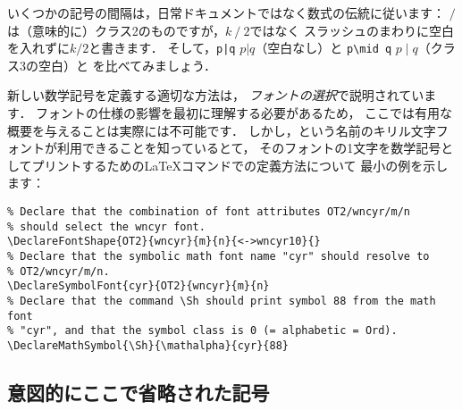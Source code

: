 いくつかの記号の間隔は，日常ドキュメントではなく数式の伝統に従います：
$/$は（意味的に）クラス2のものですが，$k\mathbin{/}2$ではなく
スラッシュのまわりに空白を入れずに$k/2$と書きます．
そして，\verb'p|q' $p\vert q$（空白なし）と
\verb'p\mid q' $p\mid q$（クラス3の空白）と
を比べてみましょう．

新しい数学記号を定義する適切な方法は，
\emph{\LaTeXe{}フォントの選択}で説明されています\cite{fntguide}．
フォントの仕様の影響を最初に理解する必要があるため，
ここでは有用な概要を与えることは実際には不可能です．
しかし，という名前のキリル文字フォントが利用できることを知っているとて，
そのフォントの1文字を数学記号としてプリントするための\LaTeX{}コマンドでの定義方法について
最小の例を示します：
\begin{verbatim}
% Declare that the combination of font attributes OT2/wncyr/m/n
% should select the wncyr font.
\DeclareFontShape{OT2}{wncyr}{m}{n}{<->wncyr10}{}
% Declare that the symbolic math font name "cyr" should resolve to
% OT2/wncyr/m/n.
\DeclareSymbolFont{cyr}{OT2}{wncyr}{m}{n}
% Declare that the command \Sh should print symbol 88 from the math font
% "cyr", and that the symbol class is 0 (= alphabetic = Ord).
\DeclareMathSymbol{\Sh}{\mathalpha}{cyr}{88}
\end{verbatim}

\subsection{意図的にここで省略された記号}

